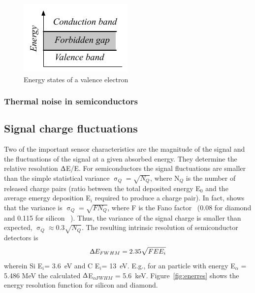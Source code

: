 \documentclass[11pt]{mytustyle}  %
\begin{document}
\begin{figure}[!ht]
\begin{center}
\includegraphics[width=0.4\linewidth]{plots/energygap}
\caption{Energy states of a valence electron}
\label{fig:energygap}
\end{center}
\end{figure}




\subsubsection{Thermal noise in semiconductors}







\subsection{Signal charge fluctuations}
Two of the important sensor characteristics are the magnitude of the signal and the fluctuations of the signal at a given absorbed energy. They determine the relative resolution $\Updelta$E/E. For semiconductors the signal fluctuations are smaller than the simple statistical variance $\upsigma_Q=\sqrt{N_Q}$, where N$_Q$ is the number of released charge pairs (ratio between the total deposited energy E$_0$ and the average emergy deposition E$_i$ required to produce a charge pair). In fact, \cite{} shows that the variance is $\upsigma_Q=\sqrt{F N_Q}$, where F is the Fano factor~\cite{} (0.08 for diamond and 0.115 for silicon ~\cite{}). Thus, the variance of the signal charge is smaller than expected, $\upsigma_Q\approx0.3 \sqrt{N_Q}$. The resulting intrinsic resolution of semiconductor detectors is 
\begin{equation}
\label{eq:efwhm}
\Updelta E_{FWHM} = 2.35 \sqrt{FEE_i} 
\end{equation} 
wherein Si E$_i$= 3.6~eV and C E$_i$= 13~eV. E.g., for an \ga particle with energy E$_\alpha$ = 5.486 MeV the calculated $\Updelta$E$_{\alpha FWHM}$ = 5.6~keV. Figure~\ref{fig:enerres} shows the energy resolution function for silicon and diamond.
\end{document}
